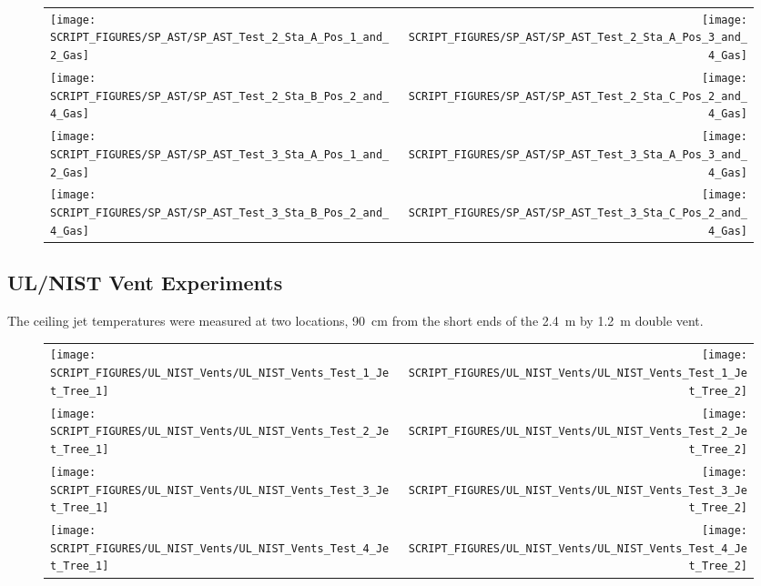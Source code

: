 \newpage

\begin{figure}[p]
\begin{tabular*}{\textwidth}{l@{\extracolsep{\fill}}r}
\texttt{[image: SCRIPT\_FIGURES/SP\_AST/SP\_AST\_Test\_2\_Sta\_A\_Pos\_1\_and\_2\_Gas]} &
\texttt{[image: SCRIPT\_FIGURES/SP\_AST/SP\_AST\_Test\_2\_Sta\_A\_Pos\_3\_and\_4\_Gas]} \\
\texttt{[image: SCRIPT\_FIGURES/SP\_AST/SP\_AST\_Test\_2\_Sta\_B\_Pos\_2\_and\_4\_Gas]} &
\texttt{[image: SCRIPT\_FIGURES/SP\_AST/SP\_AST\_Test\_2\_Sta\_C\_Pos\_2\_and\_4\_Gas]} \\
\texttt{[image: SCRIPT\_FIGURES/SP\_AST/SP\_AST\_Test\_3\_Sta\_A\_Pos\_1\_and\_2\_Gas]} &
\texttt{[image: SCRIPT\_FIGURES/SP\_AST/SP\_AST\_Test\_3\_Sta\_A\_Pos\_3\_and\_4\_Gas]} \\
\texttt{[image: SCRIPT\_FIGURES/SP\_AST/SP\_AST\_Test\_3\_Sta\_B\_Pos\_2\_and\_4\_Gas]} &
\texttt{[image: SCRIPT\_FIGURES/SP\_AST/SP\_AST\_Test\_3\_Sta\_C\_Pos\_2\_and\_4\_Gas]}
\end{tabular*}
\label{SP_Test_2_3_Gas}
\end{figure}

\clearpage

\subsection{UL/NIST Vent Experiments}

The ceiling jet temperatures were measured at two locations, 90~cm from the short ends of the 2.4~m by 1.2~m double vent.

\newpage

\begin{figure}[p]
\begin{tabular*}{\textwidth}{l@{\extracolsep{\fill}}r}
\texttt{[image: SCRIPT\_FIGURES/UL\_NIST\_Vents/UL\_NIST\_Vents\_Test\_1\_Jet\_Tree\_1]} &
\texttt{[image: SCRIPT\_FIGURES/UL\_NIST\_Vents/UL\_NIST\_Vents\_Test\_1\_Jet\_Tree\_2]} \\
\texttt{[image: SCRIPT\_FIGURES/UL\_NIST\_Vents/UL\_NIST\_Vents\_Test\_2\_Jet\_Tree\_1]} &
\texttt{[image: SCRIPT\_FIGURES/UL\_NIST\_Vents/UL\_NIST\_Vents\_Test\_2\_Jet\_Tree\_2]} \\
\texttt{[image: SCRIPT\_FIGURES/UL\_NIST\_Vents/UL\_NIST\_Vents\_Test\_3\_Jet\_Tree\_1]} &
\texttt{[image: SCRIPT\_FIGURES/UL\_NIST\_Vents/UL\_NIST\_Vents\_Test\_3\_Jet\_Tree\_2]} \\
\texttt{[image: SCRIPT\_FIGURES/UL\_NIST\_Vents/UL\_NIST\_Vents\_Test\_4\_Jet\_Tree\_1]} &
\texttt{[image: SCRIPT\_FIGURES/UL\_NIST\_Vents/UL\_NIST\_Vents\_Test\_4\_Jet\_Tree\_2]}
\end{tabular*}
\label{UL_NIST_Ceiling_Jet}
\end{figure}


